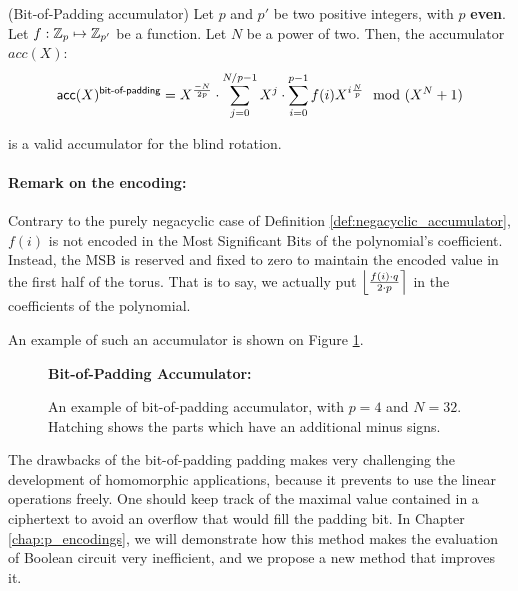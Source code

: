 \begin{definition}(Bit-of-Padding accumulator)
	Let $p$ and $p'$ be two positive integers, with $p$ \textbf{even}. Let $f: \mathbb{Z}_p \mapsto \mathbb{Z}_{p'}$ be a function. Let $N$ be a power of two. Then, the accumulator $acc(X)$:
	\[
		\textsf{acc}(X)^{\textsf{bit-of-padding}} = X^{\frac{-N}{2p}} \cdot \sum_{j=0}^{N / p - 1} X^j \cdot \sum_{i=0}^{p - 1} f(i) X^{i \frac{N}{p}} \mod (X^N + 1)
	\]
	
	is a valid accumulator for the blind rotation.
	\paragraph{Remark on the encoding:}
	Contrary to the purely negacyclic case of Definition \ref{def:negacyclic_accumulator}, $f(i)$ is not encoded in the Most Significant Bits of the polynomial's coefficient. Instead, the MSB is reserved and fixed to zero to maintain the encoded value in the first half of the torus. That is to say, we actually put $\left \lfloor \frac{f(i) \cdot q}{2 \cdot p} \right \rceil$ in the coefficients of the polynomial.
\end{definition}


An example of such an accumulator is shown on Figure \ref{fig:negacyclic_accumulator}.

\begin{figure}[H]
	\centering
				
	\vspace{1.5em}
	
	\textbf{Bit-of-Padding Accumulator:}\\[0.5em]
	
	\caption{An example of bit-of-padding accumulator, with $p=4$ and $N = 32$. Hatching shows the parts which have an additional minus signs.}
	\label{fig:negacyclic_accumulator}
\end{figure}





The drawbacks of the bit-of-padding padding makes very challenging the development of homomorphic applications, because it prevents to use the linear operations freely. One should keep track of the maximal value contained in a ciphertext to avoid an overflow that would fill the padding bit. In Chapter \ref{chap:p_encodings}, we will demonstrate how this method makes the evaluation of Boolean circuit very inefficient, and we propose a new method that improves it.

